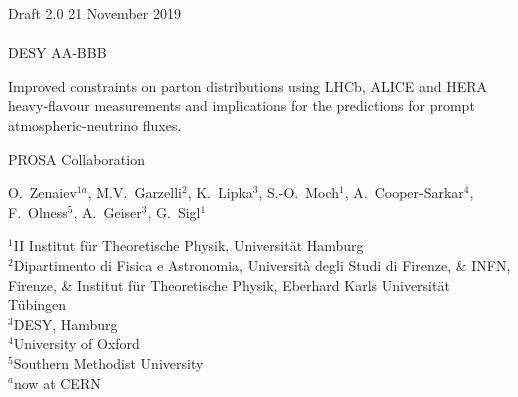 \documentclass[12pt]{article}
\begin{document}
\begin{titlepage}
\noindent
Draft 2.0  \hfill 21 November 2019\\
\\
DESY AA-BBB %
\\

\vspace{1.0cm}

\begin{center}
  {\bf 

\large

Improved constraints on parton distributions using LHCb, ALICE and HERA heavy-flavour measurements and implications for the predictions for prompt atmospheric-neutrino fluxes. 
  }
  \vspace{1.0cm}

  {\large
    PROSA Collaboration
  }\\

  \vspace{0.4cm}

\end{center}
\noindent
O.~Zenaiev$^{1a}$, \mbox{M.V.~Garzelli}$^{2}$, K.~Lipka$^{3}$, \mbox{S.-O.~Moch}$^{1}$, A.~Cooper-Sarkar$^{4}$, F.~Olness$^{5}$, A.~Geiser$^{3}$, G.~Sigl$^{1}$\\


\noindent


{\footnotesize{
		\noindent
		$^{1}$II Institut f\"ur Theoretische Physik, Universit\"at Hamburg\\
		$^{2}$Dipartimento di Fisica e Astronomia, Universit\`a degli Studi di Firenze, \& INFN, Firenze, \& Institut f\"ur Theoretische Physik, Eberhard Karls Universit\"at T\"ubingen\\
		$^{3}${DESY, Hamburg}\\
		$^{4}$University of Oxford\\
		$^{5}$Southern Methodist University\\
		$^{a}$now at CERN\\
	}
}


\end{titlepage}
\end{document}

